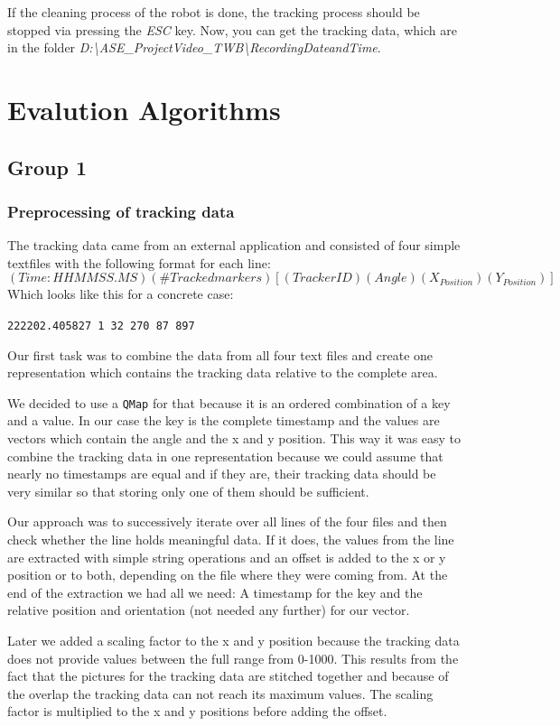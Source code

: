 \documentclass[twoside]{article}
\begin{document}
If the cleaning process of the robot is done, the tracking process should be stopped via pressing the \textit{ESC} key. Now, you can get the tracking data, which are in the folder \textit{D:\textbackslash ASE\_ProjectVideo\_TWB\textbackslash RecordingDateandTime}.

\section{Evalution Algorithms}
\subsection{Group 1}
\subsubsection{Preprocessing of tracking data} %
The tracking data came from an external application and consisted of four simple textfiles with the following format for each line:
\[(Time:HHMMSS.MS) (\#Tracked markers) [(Tracker ID) (Angle) (X_{Position}) (Y_{Position})] \]
Which looks like this for a concrete case:
\begin{center}
\texttt{222202.405827\ 1\ 32\ 270\ 87\ 897}
\end{center}
Our first task was to combine the data from all four text files and create one representation which contains the tracking data relative to the complete area. 

We decided to use a \texttt{QMap} for that because it is an ordered combination of a key and a value. In our case the key is the complete timestamp and the values are vectors which contain the angle and the x and y position. This way it was easy to combine the tracking data in one representation because we could assume that nearly no timestamps are equal and if they are, their tracking data should be very similar so that storing only one of them should be sufficient.

Our approach was to successively iterate over all lines of the four files and then check whether the line holds meaningful data. If it does, the values from the line are extracted with simple string operations and an offset is added to the x or y position or to both, depending on the file where they were coming from. At the end of the extraction we had all we need: A timestamp for the key and the relative position and orientation (not needed any further) for our vector.

Later we added a scaling factor to the x and y position because the tracking data does not provide values between the full range from 0-1000. This results from the fact that the pictures for the tracking data are stitched together and because of the overlap the tracking data can not reach its maximum values. The scaling factor is multiplied to the x and y positions before adding the offset.
\end{document}
